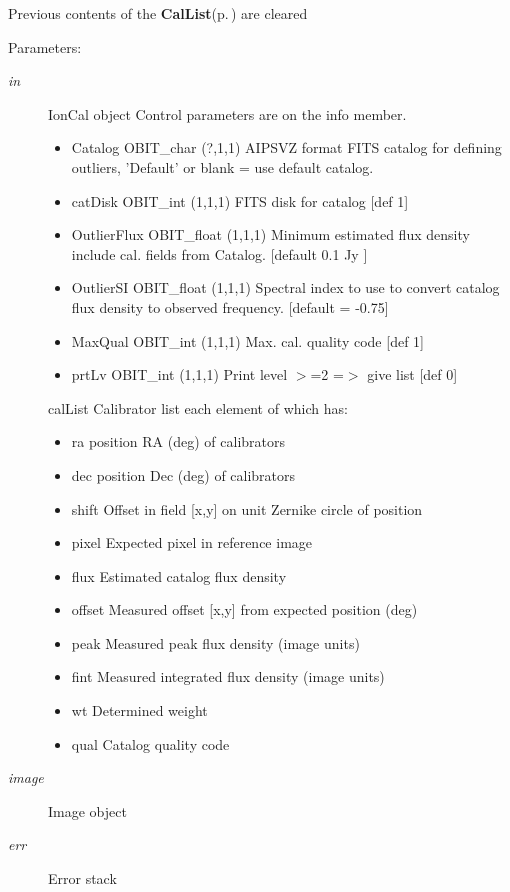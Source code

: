 Previous contents of the {\bf Cal\-List}{\rm (p.\,\pageref{structCalList})} are cleared \begin{Desc}
\item[Parameters:]
\begin{description}
\item[{\em in}]Ion\-Cal object Control parameters are on the info member. \begin{itemize}
\item Catalog OBIT\_\-char (?,1,1) AIPSVZ format FITS catalog for defining outliers, 'Default' or blank = use default catalog. \item cat\-Disk OBIT\_\-int (1,1,1) FITS disk for catalog [def 1] \item Outlier\-Flux OBIT\_\-float (1,1,1) Minimum estimated flux density include cal. fields from Catalog. [default 0.1 Jy ] \item Outlier\-SI OBIT\_\-float (1,1,1) Spectral index to use to convert catalog flux density to observed frequency. [default = -0.75] \item Max\-Qual OBIT\_\-int (1,1,1) Max. cal. quality code [def 1] \item prt\-Lv OBIT\_\-int (1,1,1) Print level $>$=2 =$>$ give list [def 0]\end{itemize}
cal\-List Calibrator list each element of which has: \begin{itemize}
\item ra position RA (deg) of calibrators \item dec position Dec (deg) of calibrators \item shift Offset in field [x,y] on unit Zernike circle of position \item pixel Expected pixel in reference image \item flux Estimated catalog flux density \item offset Measured offset [x,y] from expected position (deg) \item peak Measured peak flux density (image units) \item fint Measured integrated flux density (image units) \item wt Determined weight \item qual Catalog quality code \end{itemize}
\item[{\em image}]Image object \item[{\em err}]Error stack \end{description}
\end{Desc}
